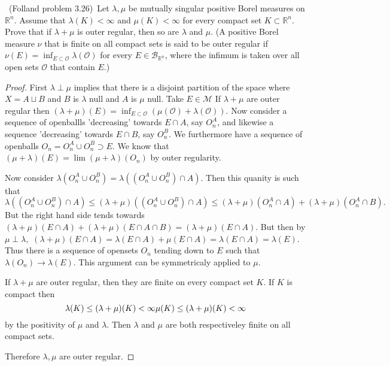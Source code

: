 \documentclass[11pt]{amsart}
\theoremstyle{definition}
\numberwithin{theorem}{section}
\numberwithin{definition}{section}
\numberwithin{equation}{section}
\def\reals{{\mathbb R}}
\def\scriptm{{\mathcal M}}
\def\scriptb{{\mathcal B}}
\def\scripto{{\mathcal O}}
\begin{document}
\medskip {}\ (Folland problem 3.26)\ 
Let $\lambda,\mu$ be mutually singular positive Borel measures on $\reals^n$. 
Assume that $\lambda(K)<\infty$ and $\mu(K)<\infty$
for every compact set $K\subset\reals^n$.
Prove that if $\lambda+\mu$ is outer regular, then so are $\lambda$ and $\mu$.
(A positive Borel measure $\nu$ that is finite on all compact sets is said to be outer regular 
if $\nu(E) = \inf_{E\subset\scripto}\lambda(\scripto)$ for every $E\in\scriptb_{\reals^n}$,
where the infimum is taken over all open sets $\scripto$ that contain $E$.)
\begin{proof}
	First $\lambda \perp \mu$ implies that there is a disjoint partition of the space where 
	$X = A \sqcup B$ and $B$ is $\lambda$ null and $A$ is $\mu$ null. Take $E \in \scriptm$ If $\lambda + \mu$ are outer regular
	then $(\lambda + \mu)(E) = \inf_{E\subset\scripto}(\mu(\scripto) + \lambda(\scripto))$. Now consider a sequence of openballls
	'decreasing' towards $E \cap A$, say $O^A_n$, and likewise a sequence 'decreasing' towards $E \cap B$, say $O^B_n$. We furthermore have
	a sequence of openballs $O_n = O_n^A \cup O_n^B \supset E$. We know that $(\mu+\lambda)(E) = \lim (\mu + \lambda)(O_n)$ by outer regularity.

	Now consider $\lambda(O^A_n \cup O^B_n) = \lambda((O_n^A \cup O_n^B) \cap A).$ Then this quanity is such that
	$\lambda((O_n^A \cup O_n^B) \cap A) \leq (\lambda+\mu)((O_n^A \cup O_n^B) \cap A) \leq (\lambda+\mu)(O_n^A \cap A) + (\lambda+\mu)(O_n^A \cap B).$ But the right hand side tends towards $(\lambda + \mu)(E \cap A) + (\lambda + \mu)(E \cap A \cap B) = (\lambda + \mu)(E \cap A).$
	But then by $\mu \perp \lambda,$ $(\lambda + \mu)(E \cap A) = \lambda(E \cap A) + \mu(E \cap A) = \lambda(E \cap A) = \lambda(E).$ Thus there is a sequence of opensets $O_n$ tending down to $E$ such that $\lambda(O_n) \to \lambda(E).$ This argument can be symmetricaly applied to $\mu$.


	If $\lambda + \mu$ are outer regular, then they are finite on every compact set $K$. If $K$ is compact
	then
	\begin{equation*}
		\lambda(K) \leq  (\lambda + \mu)(K) < \infty \\
		\mu(K) \leq  (\lambda + \mu)(K) < \infty \\
	\end{equation*}
	by the positivity of $\mu$ and $\lambda$.  Then $\lambda$ and $\mu$ are both respectiveley finite on all compact sets. 

	Therefore $\lambda, \mu$ are outer regular.
\end{proof}
\end{document}
